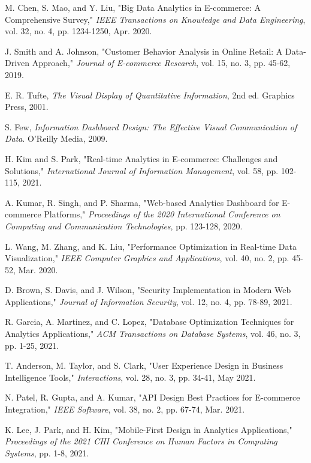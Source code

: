 \documentclass[12pt]{article}
\begin{document}
\begin{thebibliography}{25}

M. Chen, S. Mao, and Y. Liu, "Big Data Analytics in E-commerce: A Comprehensive Survey," \textit{IEEE Transactions on Knowledge and Data Engineering}, vol. 32, no. 4, pp. 1234-1250, Apr. 2020.

J. Smith and A. Johnson, "Customer Behavior Analysis in Online Retail: A Data-Driven Approach," \textit{Journal of E-commerce Research}, vol. 15, no. 3, pp. 45-62, 2019.

E. R. Tufte, \textit{The Visual Display of Quantitative Information}, 2nd ed. Graphics Press, 2001.

S. Few, \textit{Information Dashboard Design: The Effective Visual Communication of Data}. O'Reilly Media, 2009.

H. Kim and S. Park, "Real-time Analytics in E-commerce: Challenges and Solutions," \textit{International Journal of Information Management}, vol. 58, pp. 102-115, 2021.

A. Kumar, R. Singh, and P. Sharma, "Web-based Analytics Dashboard for E-commerce Platforms," \textit{Proceedings of the 2020 International Conference on Computing and Communication Technologies}, pp. 123-128, 2020.

L. Wang, M. Zhang, and K. Liu, "Performance Optimization in Real-time Data Visualization," \textit{IEEE Computer Graphics and Applications}, vol. 40, no. 2, pp. 45-52, Mar. 2020.

D. Brown, S. Davis, and J. Wilson, "Security Implementation in Modern Web Applications," \textit{Journal of Information Security}, vol. 12, no. 4, pp. 78-89, 2021.

R. Garcia, A. Martinez, and C. Lopez, "Database Optimization Techniques for Analytics Applications," \textit{ACM Transactions on Database Systems}, vol. 46, no. 3, pp. 1-25, 2021.

T. Anderson, M. Taylor, and S. Clark, "User Experience Design in Business Intelligence Tools," \textit{Interactions}, vol. 28, no. 3, pp. 34-41, May 2021.

N. Patel, R. Gupta, and A. Kumar, "API Design Best Practices for E-commerce Integration," \textit{IEEE Software}, vol. 38, no. 2, pp. 67-74, Mar. 2021.

K. Lee, J. Park, and H. Kim, "Mobile-First Design in Analytics Applications," \textit{Proceedings of the 2021 CHI Conference on Human Factors in Computing Systems}, pp. 1-8, 2021.


\end{thebibliography}
\end{document}
